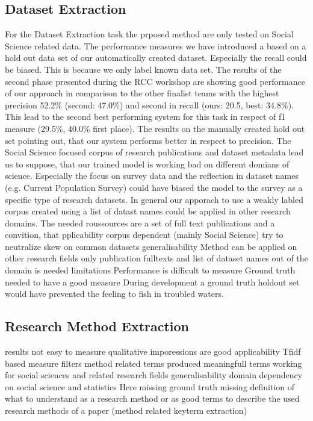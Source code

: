 \subsection{Dataset Extraction}
For the Dataset Extraction task the prposed method are only tested on Social Science related data.
The performance measures we have introduced a based on a hold out data set of our automatically created dataset.
Especially the recall could be biased.
This is because we only label known data set.
The results of the second phase presented during the RCC workshop are showing good performance of our approach in comparison to the other finalist teams with the highest precision 52.2\% (second: 47.0\%)
and second in recall (ours: 20.5, best: 34.8\%).
This lead to the second best performing system for this task in respect of f1 measure (29.5\%, 40.0\% first place).
The results on the manually created hold out set pointing out, that our system performs better in respect to precision.
The Social Science focused corpus of research publications and dataset metadata lead us to suppose, that our trained model is working bad on different domians of science.
Especially the focus on survey data and the reflection in dataset names (e.g. Current Population Survey) could have biased the model to the survey as a specific type of research datasets.
In general our apporach to use a weakly labled corpus created using a list of datast names could be applied in other research domains.
The needed roussources are a set of full text publications and a 
convition, that 
pplicability
    corpus dependent (mainly Social Science)
    try to neutralize skew on common datasets
generalisability
    Method can be applied on other research fields
    only publication fulltexts and list of dataset names out of the domain is needed
limitations
    Performance is difficult to measure
    Ground truth needed to have a good measure
    During development a ground truth holdout set would have prevented the feeling to fish in troubled waters.


\subsection{Research Method Extraction}
results
    not easy to measure qualitative imporessions are good
applicability
    Tfidf based measure filters method related terms produced meaningfull terms
    working for social sciences and related research fields
generalisability
    domain dependency on social science and statistics
    Here missing ground truth
    missing definition of what to understand as a research method or as good terms to describe the used research methods of a paper (method related keyterm extraction)

